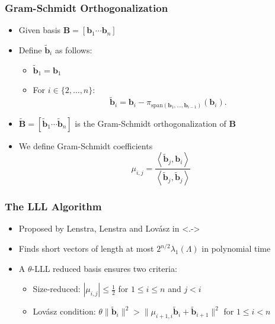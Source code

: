 \documentclass[t, aspectratio=169]{beamer}
\begin{document}
\begin{frame}
    \frametitle{Gram-Schmidt Orthogonalization}
    \begin{itemize}[<+->]
        \item Given basis $\mathbf{B} = \left[\mathbf{b}_1 \cdots \mathbf{b}_n\right]$
        \item Define $\tilde{\mathbf{b}}_i$ as follows:
              \begin{itemize}
                  \item $\tilde{\mathbf{b}}_1 = \mathbf{b}_1$
                  \item For $i \in \{2, \ldots, n\}$:
                        \begin{equation*}
                            \tilde{\mathbf{b}}_i = \mathbf{b}_i - \pi_{\text{span}(\mathbf{b}_1, \ldots, \mathbf{b}_{i-1})}(\mathbf{b}_i).
                        \end{equation*}
              \end{itemize}
        \item $\tilde{\mathbf{B}} = \left[\tilde{\mathbf{b}}_1 \cdots \tilde{\mathbf{b}}_n\right]$ is the Gram-Schmidt orthogonalization of $\mathbf{B}$
        \item We define Gram-Schmidt coefficients
              \begin{equation*}
                  \mu_{i, j} = \frac{\left\langle \tilde{\mathbf{b}}_j, \mathbf{b}_i\right\rangle}{\left\langle \tilde{\mathbf{b}}_j, \tilde{\mathbf{b}}_j\right\rangle}
              \end{equation*}
    \end{itemize}
\end{frame}
\begin{frame}
    \frametitle{The LLL Algorithm}
    \begin{itemize}[<+->]
        \item Proposed by Lenstra, Lenstra and Lovász in \only<.->{} %
        \item Finds short vectors of length at most $2^{n/2} \lambda_1(\Lambda)$ in polynomial time %
        \item A $\theta$-LLL reduced basis ensures two criteria:
              \begin{itemize}[<+->]
                  \item Size-reduced: $|\mu_{i,j}| \leq \frac{1}{2}$ for $1\leq i \leq n$ and $j < i$
                  \item Lovász condition: $\theta \| \tilde{\mathbf{b}}_i \|^2 > \| \mu_{i+1, i} \tilde{\mathbf{b}}_i + \tilde{\mathbf{b}}_{i+1} \|^2$ for $1\leq i < n$
              \end{itemize}
    \end{itemize}
\end{frame} %
\end{document}

